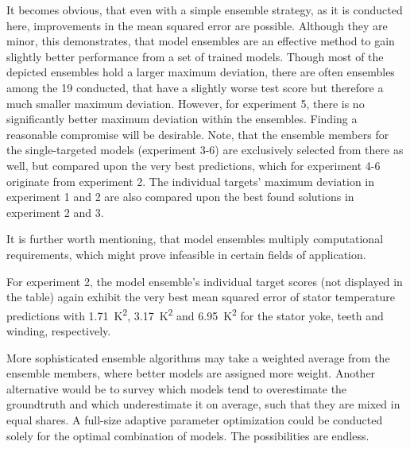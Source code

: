 It becomes obvious, that even with a simple ensemble strategy, as it is conducted here, improvements in the mean squared error are possible.
Although they are minor, this demonstrates, that model ensembles are an effective method to gain slightly better performance from a set of trained models.
Though most of the depicted ensembles hold a larger maximum deviation, there are often ensembles among the 19 conducted, that have a slightly worse test score but therefore a much smaller maximum deviation.
However, for experiment 5, there is no significantly better maximum deviation within the ensembles.
Finding a reasonable compromise will be desirable.
Note, that the ensemble members for the single-targeted models (experiment 3-6) are exclusively selected from there as well, but compared upon the very best predictions, which for experiment 4-6 originate from experiment 2.
The individual targets' maximum deviation in experiment 1 and 2 are also compared upon the best found solutions in experiment 2 and 3.

It is further worth mentioning, that model ensembles multiply computational requirements, which might prove infeasible in certain fields of application.

For experiment 2, the model ensemble's individual target scores (not displayed in the table) again exhibit the very best mean squared error of stator temperature predictions with \SI{1.71}{\kelvin\squared}, \SI{3.17}{\kelvin\squared} and \SI{6.95}{\kelvin\squared} for the stator yoke, teeth and winding, respectively.

More sophisticated ensemble algorithms may take a weighted average from the ensemble members, where better models are assigned more weight.
Another alternative would be to survey which models tend to overestimate the groundtruth and which underestimate it on average, such that they are mixed in equal shares.
A full-size adaptive parameter optimization could be conducted solely for the optimal combination of models.
The possibilities are endless.


